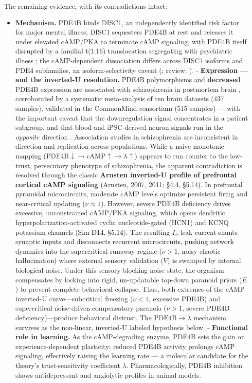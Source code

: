 \documentclass[
]{article}
\providecommand{\tightlist}{%
  \setlength{\itemsep}{0pt}\setlength{\parskip}{0pt}}
\begin{document}
The remaining evidence, with its contradictions intact:

\begin{itemize}
\tightlist
\item
  \textbf{Mechanism.} PDE4B binds DISC1, an independently identified
  risk factor for major mental illness; DISC1 sequesters PDE4B at rest
  and releases it under elevated cAMP/PKA to terminate cAMP signaling,
  with PDE4B itself disrupted by a familial t(1;16) translocation
  segregating with psychiatric illness ; the cAMP-dependent dissociation
  differs across DISC1 isoforms and PDE4 subfamilies, an
  isoform-selectivity caveat (; review: ). - \textbf{Expression --- and
  the inverted-U resolution.} PDE4B polymorphisms and \textbf{decreased}
  PDE4B expression are associated with schizophrenia in postmortem brain
  , corroborated by a systematic meta-analysis of ten brain datasets
  (437 samples), validated in the CommonMind consortium (515 samples)
  --- with the important caveat that the downregulation signal
  concentrates in a patient subgroup, and that blood and iPSC-derived
  neuron signals run in the \emph{opposite} direction . Association
  studies in schizophrenia are inconsistent in direction and replication
  across populations. While a naive monotonic mapping
  (\(\mathrm{PDE4B} \downarrow \to \mathrm{cAMP} \uparrow \to \lambda \uparrow\))
  appears to run counter to the low-trust, persecutory phenotype of
  schizophrenia, the apparent contradiction is resolved through the
  classic \textbf{Arnsten inverted-U profile of prefrontal cortical cAMP
  signaling} (Arnsten, 2007, 2011; §4.4, §5.14). In prefrontal pyramidal
  microcircuits, moderate cAMP levels optimize persistent firing and
  near-critical updating (\(\nu \approx 1\)). However, severe PDE4B
  deficiency drives excessive, unconstrained cAMP/PKA signaling, which
  opens dendritic hyperpolarization-activated cyclic nucleotide-gated
  (HCN1) and KCNQ potassium channels (Sim D14, §5.14). The resulting
  \(I_h\) leak current shunts synaptic inputs and disconnects recurrent
  microcircuits, pushing network dynamics into the supercritical runaway
  regime (\(\nu > 1\), noisy chaotic hallucination) where external
  sensory validation (\(V\)) is swamped by internal biological noise.
  Under this sensory-blocking noise state, the organism compensates by
  locking into rigid, un-updatable top-down paranoid priors (\(E\)) to
  prevent complete behavioral collapse. Thus, both extremes of the cAMP
  inverted-U curve---subcritical freezing (\(\nu < 1\), excessive PDE4B)
  and supercritical noise-driven compensatory paranoia (\(\nu > 1\),
  severe PDE4B deficiency)---produce behavioral distrust. The
  \(\mathrm{PDE4B} \to \lambda\) mechanism survives as the non-linear,
  inverted-U labeled hypothesis below. - \textbf{Functional role in
  learning.} As the cAMP-degrading enzyme, PDE4B sets the gain on
  experience-dependent plasticity: reduced PDE4B activity prolongs cAMP
  signaling, effectively raising the learning rate --- a molecular
  candidate for the theory's trust-sensitivity coefficient \(\lambda\).
  Pharmacologically, PDE4B inhibition shows antidepressant and
  anxiolytic profiles in animal models.
\end{itemize}
\end{document}
